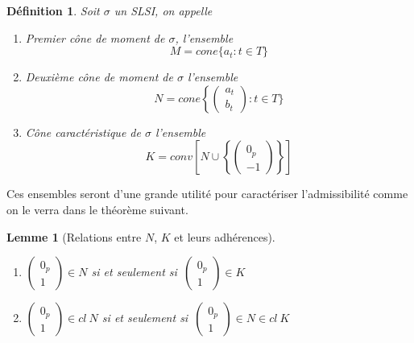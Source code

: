 \documentclass[11pt]{report}
\newenvironment{boxtheorem}
{\begin{tcolorbox}
		[enhanced jigsaw,breakable,pad at break*=2mm,
		colback=black!5,colframe=bleueLeger]}
	{\end{tcolorbox}}
\newenvironment{boxdefinition}
{\begin{tcolorbox}
		[enhanced jigsaw,breakable,pad at break*=1mm,
		colback=black!5!white,boxrule=0pt,frame hidden,
		borderline west={1.5mm}{-2mm}{blue}]}
	{\end{tcolorbox}}
\theoremstyle{styletheorem}
\newtheorem{lemma}[theoreme]{Lemme}
\theoremstyle{styledef}
\newtheorem{definitions}[theoreme]{Définition}
\theoremstyle{remark}
\newenvironment{lemme}
{\vspace*{0.3cm}\begin{boxtheorem}\begin{lemma}}{\end{lemma}\end{boxtheorem}\vspace*{0.3cm}}
\newenvironment{definition}{\vspace*{0.3cm}\begin{boxdefinition}\begin{definitions}}{\end{definitions}\end{boxdefinition}\vspace*{0.3cm}}
\newcommand{\ssi}{si et seulement si\  }
\begin{document}
\begin{definition}
	Soit $\sigma$ un SLSI, on appelle
	\begin{enumerate}[label = $\bullet$]
		\item \emph{Premier cône de moment} de $\sigma$, l'ensemble 
		$$M = cone\lbrace a_t\colon t \in T \rbrace$$
		\item \emph{Deuxième cône de moment} de $\sigma$ l'ensemble 
		$$ N = cone\left\lbrace \begin{pmatrix}
			a_t\\ b_t
		\end{pmatrix} \colon t \in T\rbrace \right.$$
		\item \emph{Cône caractéristique} de $\sigma$ l'ensemble $$K = conv\left[ N \cup \left\lbrace \begin{pmatrix}
			0_p\\ -1
		\end{pmatrix} \right\rbrace \right]$$
		
	\end{enumerate}
\end{definition}
Ces ensembles seront d'une grande utilité pour caractériser l'admissibilité comme on le verra dans le théorème suivant.
\begin{lemme}[Relations entre $N$, $K$ et leurs adhérences]
	\begin{enumerate}[label = (\roman*)]\ \\
		\item $\begin{pmatrix}
			0_p\\ 1
		\end{pmatrix}\in N$ \ssi $\begin{pmatrix}
			0_p\\1
		\end{pmatrix} \in K$
		\item $\begin{pmatrix}
			0_p\\ 1
		\end{pmatrix}\in cl\ N$ \ssi $\begin{pmatrix}
			0_p\\ 1
		\end{pmatrix}\in N \in cl \ K$
	\end{enumerate}
\end{lemme}
\end{document}
